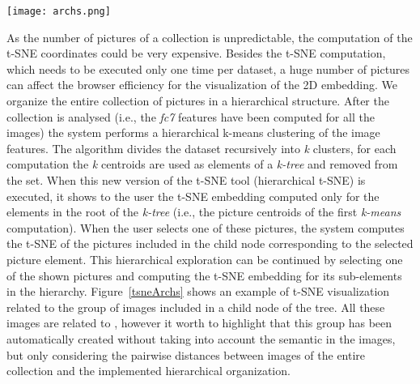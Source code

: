 \begin{figure*}
	\centering
	\texttt{[image: archs.png]}
	\caption{visualization interface for t-SNE based image embedding. In this example, a subset of images is shown. All the images are related to photos depicting , however the group if images has been automatically created without taking into account the semantic of the images.}
	\label{tsneArchs}
\end{figure*}
As the number of pictures of a collection is unpredictable, the computation of the t-SNE coordinates could be very expensive. Besides the t-SNE computation, which needs to be executed only one time per dataset, a huge number of pictures can affect the browser efficiency for the visualization of the 2D embedding. We organize the entire collection of pictures in a hierarchical structure. After the collection is analysed (i.e., the \textit{fc7} features have been computed for all the images) the system performs a hierarchical k-means clustering of the image features. The algorithm divides the dataset recursively into \textit{k} clusters, for each computation the \textit{k} centroids are used as elements of a \textit{k-tree} and removed from the set. %
When this new version of the t-SNE tool (hierarchical t-SNE) is executed, it shows to the user the t-SNE embedding computed only for the elements in the root of the \textit{k-tree} (i.e., the picture centroids of the first \textit{k-means} computation). When the user selects one of these pictures, the system computes the t-SNE of the pictures included in the child node corresponding to the selected picture element. This hierarchical exploration can be continued by selecting one of the shown pictures and computing the t-SNE embedding for its sub-elements in the hierarchy.
Figure~\ref{tsneArchs} shows an example of t-SNE visualization related to the group of images included in a child node of the tree. All these images are related to , however it worth to highlight that this group has been automatically created without taking into account the semantic in the images, but only considering the pairwise distances between images of the entire collection and the implemented hierarchical organization.



